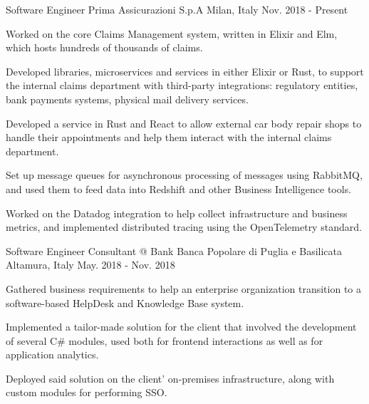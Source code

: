 

\begin{cventries}

  \cventry
    {Software Engineer} %
    {Prima Assicurazioni S.p.A} %
    {Milan, Italy} %
    {Nov. 2018 - Present} %
    {
      \begin{cvitems} %
        \item {Worked on the core Claims Management system, written in Elixir and Elm, which hosts hundreds of thousands of claims.}
        \item {Developed libraries, microservices and services in either Elixir or Rust, to support the internal claims department with third-party integrations: regulatory entities, bank payments systems, physical mail delivery services.}
        \item {Developed a service in Rust and React to allow external car body repair shops to handle their appointments and help them interact with the internal claims department.}
        \item {Set up message queues for asynchronous processing of messages using RabbitMQ, and used them to feed data into Redshift and other Business Intelligence tools.}
        \item {Worked on the Datadog integration to help collect infrastructure and business metrics, and implemented distributed tracing using the OpenTelemetry standard.}
      \end{cvitems}
    }

  \cventry
    {Software Engineer Consultant @ Bank} %
    {Banca Popolare di Puglia e Basilicata} %
    {Altamura, Italy} %
    {May. 2018 - Nov. 2018} %
    {
      \begin{cvitems} %
        \item {Gathered business requirements to help an enterprise organization transition to a software-based HelpDesk and Knowledge Base system.}
        \item {Implemented a tailor-made solution for the client that involved the development of several C\# modules, used both for frontend interactions as well as for application analytics.}
        \item {Deployed said solution on the client' on-premises infrastructure, along with custom modules for performing SSO.}
      \end{cvitems}
    }


\end{cventries}
